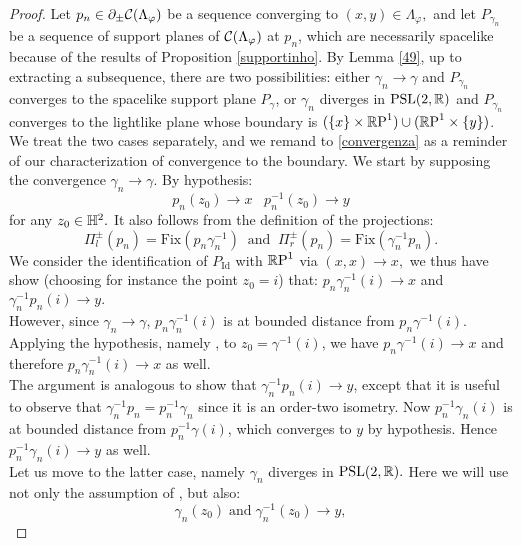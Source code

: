 \begin{proof}
    Let $p_n\in\partial_\pm\CF$ be a sequence converging to $(x,y)\in\Lambda_\varphi,$ and let $P_{\gamma_n}$ be a sequence of support planes of $\CF$ at $p_n$, which are necessarily spacelike because of the results of Proposition \ref{supportinho}. By Lemma \ref{49}, up to extracting a subsequence, there are two possibilities: either $\gamma_n\to\gamma$ and $P_{\gamma_n}$ converges to the spacelike support plane $P_\gamma$, or $\gamma_n$ diverges in $\PSL$ and $P_{\gamma_n}$ converges to the lightlike plane whose boundary is $(\{x\}\times\S)\cup(\S\times\{y\})$. We treat the two cases separately, and we remand to \ref{convergenza} as a reminder of our characterization of convergence to the boundary.
    We start by supposing the convergence $\gamma_n\to\gamma.$ By hypothesis: 
    \begin{equation}\label{18}
        p_n(z_0)\to x \;\;\; p_n^{-1}(z_0)\to y
    \end{equation}
    for any $z_0\in\H^2.$ It also follows from the definition of the projections: 
    \begin{equation}\label{19}
        \Pi_l^\pm(p_n)=\text{Fix}(p_n\gamma_n^{-1}) \;\; \text{and}\;\; \Pi_r^\pm(p_n)=\text{Fix}(\gamma_n^{-1}p_n).
    \end{equation}
  We consider the identification of $P_\text{Id}$ with $\S$ via $(x,x)\to x,$ we thus have show (choosing for instance the point $z_0=i$) that: $p_n\gamma_n^{-1}(i)\to x$ and $\gamma_n^{-1}p_n(i)\to y.$ \\
  However, since $\gamma_n\to\gamma$, $p_n\gamma_n^{-1}(i)$ is at bounded distance from $p_n\gamma^{-1}(i)$. Applying the hypothesis, namely , to $z_0=\gamma^{-1}(i)$, we have $p_n\gamma^{-1}(i)\to x$ and therefore $p_n\gamma_n^{-1}(i)\to x$ as well. \\
  The argument is analogous to show that $\gamma_n^{-1}p_n(i)\to y$, except that it is useful to observe that $\gamma_n^{-1}p_n=p_n^{-1}\gamma_n$ since it is an order-two isometry. Now $p_n^{-1}\gamma_n(i)$ is at bounded distance from $p_n^{-1}\gamma(i)$, which converges to $y$ by hypothesis. Hence $p_n^{-1}\gamma_n(i)\to y$ as well. \\
  Let us move to the latter case, namely $\gamma_n$ diverges in $\PSL.$ Here we will use not only the assumption of , but also: 
  \begin{equation}\label{20}
    \gamma_n(z_0)\;\text{and}\;\gamma_n^{-1}(z_0)\to y,
  \end{equation} 

\end{proof}

